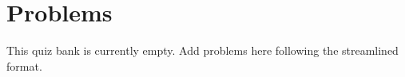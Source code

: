 \documentclass[12pt]{article}
\begin{document}
\section*{Problems}

This quiz bank is currently empty. Add problems here following the streamlined format.
\end{document}
